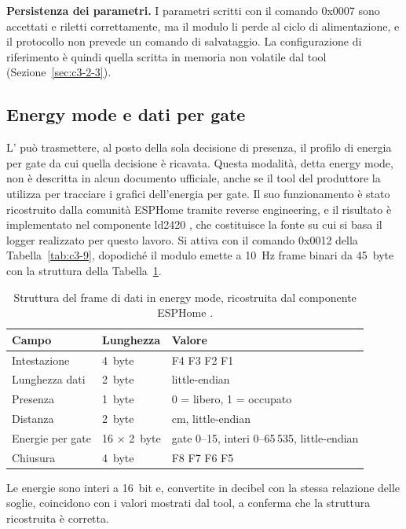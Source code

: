 \textbf{Persistenza dei parametri.} I parametri scritti con il comando 0x0007 sono accettati e riletti correttamente, ma il modulo li perde al ciclo di alimentazione, e il protocollo non prevede un comando di salvataggio. La configurazione di riferimento è quindi quella scritta in memoria non volatile dal tool (Sezione~\ref{sec:c3-2-3}).

\subsection{Energy mode e dati per gate}
\label{sec:c3-2-5}

L'\ldc{} può trasmettere, al posto della sola decisione di presenza, il profilo di energia per gate da cui quella decisione è ricavata. Questa modalità, detta energy mode, non è descritta in alcun documento ufficiale, anche se il tool del produttore la utilizza per tracciare i grafici dell'energia per gate. Il suo funzionamento è stato ricostruito dalla comunità ESPHome tramite reverse engineering, e il risultato è implementato nel componente ld2420 \cite{esphomeLD2420src}, che costituisce la fonte su cui si basa il logger realizzato per questo lavoro. Si attiva con il comando 0x0012 della Tabella~\ref{tab:c3-9}, dopodiché il modulo emette a 10~Hz frame binari da 45~byte con la struttura della Tabella~\ref{tab:c3-10}.

\begin{table}[!htb]
\centering
\caption{Struttura del frame di dati in energy mode, ricostruita dal componente ESPHome \cite{esphomeLD2420src}.}
\label{tab:c3-10}
\small
\begin{tabularx}{\linewidth}{@{}llX@{}}
\toprule
\textbf{Campo} & \textbf{Lunghezza} & \textbf{Valore} \\
\midrule
Intestazione & 4~byte & F4 F3 F2 F1 \\
Lunghezza dati & 2~byte & little-endian \\
Presenza & 1~byte & 0 = libero, 1 = occupato \\
Distanza & 2~byte & cm, little-endian \\
Energie per gate & 16 \(\times\) 2~byte & gate 0–15, interi 0--65\,535, little-endian \\
Chiusura & 4~byte & F8 F7 F6 F5 \\
\bottomrule
\end{tabularx}
\end{table}

Le energie sono interi a 16~bit e, convertite in decibel con la stessa relazione delle soglie, coincidono con i valori mostrati dal tool, a conferma che la struttura ricostruita è corretta.

